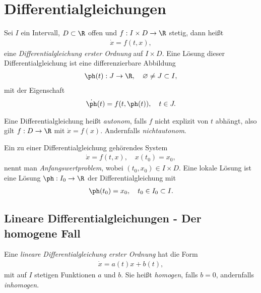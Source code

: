 \section{Differentialgleichungen}

\begin{defn}
Sei $I$ ein Intervall, $D\subset\R$ offen und $f:
I\times D\to \R$ stetig, dann heißt
\begin{align*}
\dot{x} = f(t,x),
\end{align*}
eine \emph{Differentialgleichung erster Ordnung} auf $I\times D$. Eine Lösung
dieser Differentialgleichung ist eine differenzierbare Abbildung
\begin{align*}
\ph(t) : J \to \R,\quad \varnothing \neq J \subset I,
\end{align*}
mit der Eigenschaft
\begin{align*}
\dot{\ph}(t) = f(t,\ph(t)),\quad t\in J.
\end{align*}
\end{defn}
\begin{defn}
Eine Differentialgleichung heißt \emph{autonom}, falls $f$ nicht explizit von
$t$ abhängt, also gilt $f: D\to\R$ mit $\dot{x} = f(x)$. Andernfalls
\emph{nichtautonom}.
\end{defn}
\begin{defn}
Ein zu einer Differentialgleichung gehörendes System
\begin{align*}
\dot{x} = f(t,x),\quad x(t_0) = x_0,
\end{align*}
nennt man \emph{Anfangswertproblem}, wobei $(t_0,x_0)\in I\times D$. Eine lokale
Lösung ist eine Lösung $\ph: I_0\to \R$ der Differentialgleichung mit
\begin{align*}
\ph(t_0) = x_0,\quad t_0\in I_0\subset I.
\end{align*} 
\end{defn}

\subsection{Lineare Differentialgleichungen - Der homogene Fall}
\begin{defn}
Eine \emph{lineare Differentialgleichung erster Ordnung} hat die Form
\begin{align*}
\dot{x} = a(t)x + b(t),
\end{align*}
mit auf $I$ stetigen Funktionen $a$ und $b$. Sie heißt \emph{homogen}, falls
$b=0$, andernfalls \emph{inhomogen}.
\end{defn}

